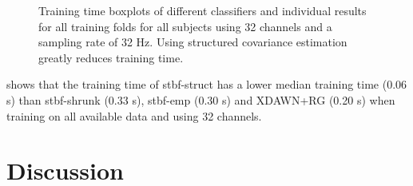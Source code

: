   \begin{figure}[t]
    \sffamily
    
    \caption[Classifier training time.]{Training time boxplots of different
    classifiers and individual results for all training folds for all subjects
    using 32 channels and a sampling rate of 32 Hz. Using structured covariance estimation greatly reduces
    training time.}
		\label{fig:stbf-struct/training-time}
	\end{figure}

	 shows that the training time of
  \ac{stbf-struct} has a lower median training time (0.06 s) than
  \ac{stbf-shrunk} (0.33 s), \ac{stbf-emp} (0.30 s) and
  XDAWN+RG (0.20 s) when training
  on all available data and using 32 channels.

	\section{Discussion}

